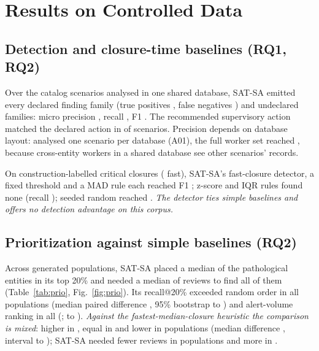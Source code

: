 \section{Results on Controlled Data}
\label{sec:results}

\subsection{Detection and closure-time baselines (RQ1, RQ2)}
Over the  catalog scenarios analysed in one shared database,
SAT-SA emitted every declared finding family (true positives , false
negatives ) and  undeclared families: micro precision
, recall , F1 . The recommended supervisory
action matched the declared action in  of 
scenarios. Precision depends on database layout: analysed one scenario per database
(A01), the full worker set reached , because cross-entity
workers in a shared database see other scenarios' records.

On  construction-labelled critical closures ( fast),
SAT-SA's fast-closure detector, a fixed threshold and a MAD rule each reached F1
; z-score and IQR rules found none (recall
); seeded random reached .
\emph{The detector ties simple baselines and offers no detection advantage on this
corpus.}

\subsection{Prioritization against simple baselines (RQ2)}
Across  generated populations, SAT-SA placed a median
 of the pathological entities in its top 20\% and needed a
median of  reviews to find all of them (Table~\ref{tab:prio},
Fig.~\ref{fig:prio}). Its recall@20\% exceeded random order in all
 populations (median paired difference
, 95\% bootstrap  to
) and alert-volume ranking in all 
(;  to ).
\emph{Against the fastest-median-closure heuristic the comparison is mixed}: higher in
, equal in  and lower in
 populations (median difference ,
interval  to ); SAT-SA needed fewer reviews
in  populations and more in .

